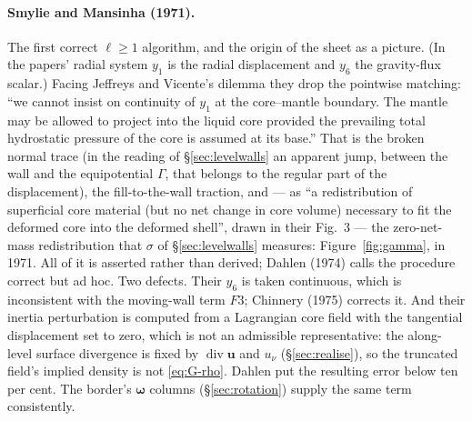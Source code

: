 \documentclass[11pt]{article}
\theoremstyle{definition}
\theoremstyle{remark}
\newcommand{\bu}{\mathbf{u}}
\newcommand{\bomega}{\boldsymbol{\omega}}
\newcommand{\Div}{\operatorname{div}}
\begin{document}
\paragraph{Smylie and Mansinha (1971).} The first correct $\ell \ge 1$
algorithm, and the origin of the sheet as a picture. (In the papers'
radial system $y_1$ is the radial displacement and $y_6$ the
gravity-flux scalar.) Facing Jeffreys
and Vicente's dilemma they drop the pointwise matching: ``we cannot
insist on continuity of $y_1$ at the core--mantle boundary. The mantle
may be allowed to project into the liquid core provided the prevailing
total hydrostatic pressure of the core is assumed at its base.'' That
is the broken normal trace (in the reading of \S\ref{sec:levelwalls}
an apparent jump, between the wall and the equipotential $\Gamma$, that
belongs to the regular part of the displacement), the fill-to-the-wall
traction, and --- as ``a redistribution of superficial core material
(but no net change in core volume) necessary to fit the deformed core
into the deformed shell'', drawn in their Fig.~3 --- the zero-net-mass
redistribution that $\sigma$ of \S\ref{sec:levelwalls} measures:
Figure~\ref{fig:gamma}, in 1971. All of it is asserted rather than
derived; Dahlen (1974) calls the procedure correct but ad hoc. Two
defects. Their $y_6$ is taken continuous, which is inconsistent with
the moving-wall term $F3$; Chinnery (1975) corrects it. And their
inertia perturbation is computed from a Lagrangian core field with the
tangential displacement set to zero, which is not an admissible
representative: the along-level surface divergence is fixed by
$\Div\bu$ and $u_\nu$ (\S\ref{sec:realise}), so the truncated field's
implied density is not \eqref{eq:G-rho}. Dahlen put the resulting
error below ten per cent. The border's $\bomega$ columns
(\S\ref{sec:rotation}) supply the same term consistently.
\end{document}
